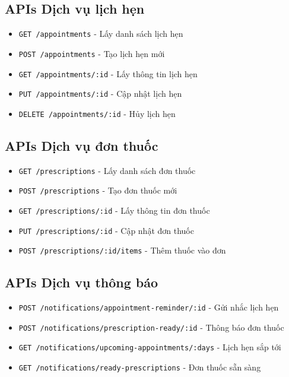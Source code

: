 \documentclass[12pt,a4paper]{report}
\begin{document}
    \subsection{APIs Dịch vụ lịch hẹn}
    \begin{itemize}
        \item \texttt{GET /appointments} - Lấy danh sách lịch hẹn
        \item \texttt{POST /appointments} - Tạo lịch hẹn mới
        \item \texttt{GET /appointments/:id} - Lấy thông tin lịch hẹn
        \item \texttt{PUT /appointments/:id} - Cập nhật lịch hẹn
        \item \texttt{DELETE /appointments/:id} - Hủy lịch hẹn
    \end{itemize}

    \subsection{APIs Dịch vụ đơn thuốc}
    \begin{itemize}
        \item \texttt{GET /prescriptions} - Lấy danh sách đơn thuốc
        \item \texttt{POST /prescriptions} - Tạo đơn thuốc mới
        \item \texttt{GET /prescriptions/:id} - Lấy thông tin đơn thuốc
        \item \texttt{PUT /prescriptions/:id} - Cập nhật đơn thuốc
        \item \texttt{POST /prescriptions/:id/items} - Thêm thuốc vào đơn
    \end{itemize}

    \subsection{APIs Dịch vụ thông báo}
    \begin{itemize}
        \item \texttt{POST /notifications/appointment-reminder/:id} - Gửi nhắc lịch hẹn
        \item \texttt{POST /notifications/prescription-ready/:id} - Thông báo đơn thuốc
        \item \texttt{GET /notifications/upcoming-appointments/:days} - Lịch hẹn sắp tới
        \item \texttt{GET /notifications/ready-prescriptions} - Đơn thuốc sẵn sàng
    \end{itemize}
\end{document}
